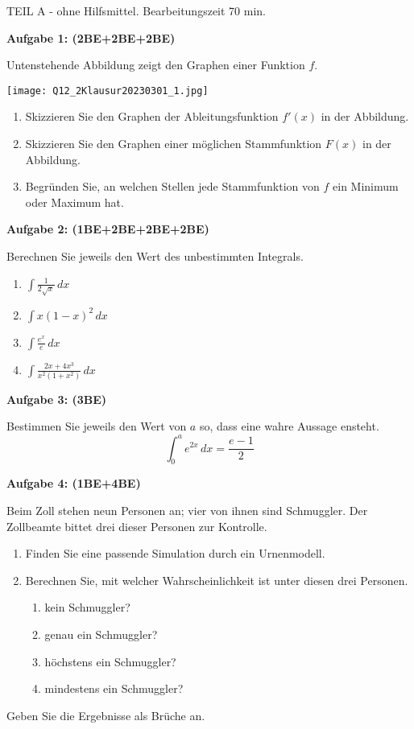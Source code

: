 \documentclass[a4paper,12pt]{article}
\newcommand{\Aufgabe}[1]{
  {
  \vspace*{0.5cm}
  \textsf{\textbf{Aufgabe #1}}
  \vspace*{0.2cm}
  
  }
}
\begin{document}
\vspace{0.3cm}
\newpage\null\thispagestyle{empty}\newpage
\newpage
\vspace{1,5cm} {TEIL A} - ohne Hilfsmittel. Bearbeitungszeit 70 min.
\vspace {0,2cm}

\Aufgabe{1: (2BE+2BE+2BE)}

Untenstehende Abbildung zeigt den Graphen einer Funktion $f$.
\begin{center}
\texttt{[image: Q12\_2Klausur20230301\_1.jpg]}
\end{center}
\begin{enumerate}[label={\alph*)}]
  \item Skizzieren Sie den Graphen der Ableitungsfunktion $f'(x)$ in der Abbildung.
  \item Skizzieren Sie den Graphen einer möglichen Stammfunktion $F(x)$ in der Abbildung.
  \item Begründen Sie, an welchen Stellen jede Stammfunktion von $f$ ein Minimum oder Maximum hat.
\end{enumerate}

\Aufgabe{2: (1BE+2BE+2BE+2BE)}
Berechnen Sie jeweils den Wert des unbestimmten Integrals.

\begin{enumerate}[label={\alph*)}]
  \item $\int \frac{1}{2\sqrt{x}}\, dx$
  \item $\int x(1-x)^2\, dx$
  \item $\int \frac{e^x}{e}\, dx$
  \item $\int \frac{2x+4x^3}{x^2(1+x^2)}\, dx$
\end{enumerate}

\Aufgabe{3: (3BE)}
Bestimmen Sie jeweils den Wert von $a$ so, dass eine wahre Aussage ensteht.
\[ \int_0^a e^{2x}\, dx = \frac{e-1}{2} \]

\newpage
\Aufgabe{4: (1BE+4BE)}
Beim Zoll stehen neun Personen an; vier von ihnen sind Schmuggler. Der Zollbeamte bittet drei dieser Personen zur Kontrolle.
  \begin{enumerate}[label={\alph*)}]
    \item Finden Sie eine passende Simulation durch ein Urnenmodell.
    \item Berechnen Sie, mit welcher Wahrscheinlichkeit ist unter diesen drei Personen.       
      \begin{enumerate}[label={(\arabic*)}]
        \item kein Schmuggler?
        \item genau ein Schmuggler?
        \item höchstens ein Schmuggler?
        \item mindestens ein Schmuggler?
      \end{enumerate}
  \end{enumerate}
Geben Sie die Ergebnisse als Brüche an.
\end{document}
